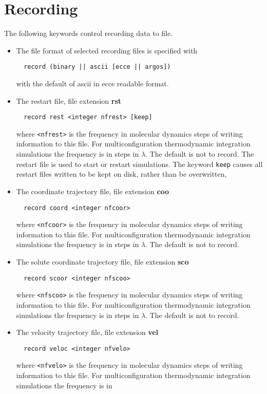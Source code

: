 \section{Recording}
The following keywords control recording data to file.
\begin{itemize}
\item
The file format of selected recording files is specified with
\begin{verbatim}
  record (binary || ascii [ecce || argos])
\end{verbatim}
with the default of ascii in ecce readable format.
\item
The restart file, file extension {\bf rst}
\begin{verbatim}
  record rest <integer nfrest> [keep]
\end{verbatim}
where \verb+<nfrest>+ is the frequency in molecular dynamics steps
of writing information to this file. For multiconfiguration
thermodynamic integration simulations the frequency is in
steps in $\lambda$. The default is not to record. The restart
file is used to start or restart simulations. The keyword {\tt keep}
causes all restart files written to be kept on disk, rather than
be overwritten, 
\item
The coordinate trajectory file, file extension {\bf coo}
\begin{verbatim}
  record coord <integer nfcoor>
\end{verbatim}
where \verb+<nfcoor>+ is the frequency in molecular dynamics steps
of writing information to this file. For multiconfiguration
thermodynamic integration simulations the frequency is in
steps in $\lambda$. The default is not to record.
\item
The solute coordinate trajectory file, file extension {\bf sco}
\begin{verbatim}
  record scoor <integer nfscoo>
\end{verbatim}
where \verb+<nfscoo>+ is the frequency in molecular dynamics steps
of writing information to this file. For multiconfiguration
thermodynamic integration simulations the frequency is in
steps in $\lambda$. The default is not to record.
\item
The velocity trajectory file, file extension {\bf vel}
\begin{verbatim}
  record veloc <integer nfvelo>
\end{verbatim}
where \verb+<nfvelo>+ is the frequency in molecular dynamics steps
of writing information to this file. For multiconfiguration
thermodynamic integration simulations the frequency is in

\end{itemize}
